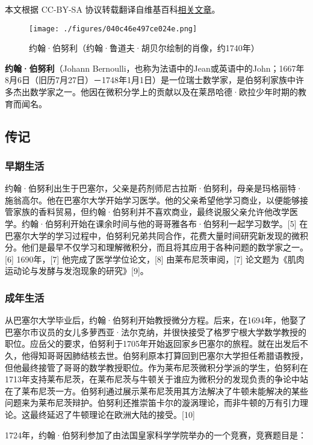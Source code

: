
本文根据 CC-BY-SA 协议转载翻译自维基百科\href{https://en.wikipedia.org/wiki/Johann_Bernoulli}{相关文章}。

\begin{figure}[ht]
\centering
\texttt{[image: ./figures/040c46e497ce024e.png]}
\caption{约翰·伯努利（约翰·鲁道夫·胡贝尔绘制的肖像，约1740年）} \label{fig_YHBNL_1}
\end{figure}
\textbf{约翰·伯努利}（Johann Bernoulli，也称为法语中的Jean或英语中的John；1667年8月6日（旧历7月27日）－1748年1月1日）是一位瑞士数学家，是伯努利家族中许多杰出数学家之一。他因在微积分学上的贡献以及在莱昂哈德·欧拉少年时期的教育而闻名。
\subsection{传记}  
\subsubsection{早期生活}  
约翰·伯努利出生于巴塞尔，父亲是药剂师尼古拉斯·伯努利，母亲是玛格丽特·施翁高尔。他在巴塞尔大学开始学习医学。他的父亲希望他学习商业，以便能够接管家族的香料贸易，但约翰·伯努利并不喜欢商业，最终说服父亲允许他改学医学。约翰·伯努利开始在课余时间与他的哥哥雅各布·伯努利一起学习数学。[5] 在巴塞尔大学的学习过程中，伯努利兄弟共同合作，花费大量时间研究新发现的微积分。他们是最早不仅学习和理解微积分，而且将其应用于各种问题的数学家之一。[6] 1690年，[7] 他完成了医学学位论文，[8] 由莱布尼茨审阅，[7] 论文题为《肌肉运动论与发酵与发泡现象的研究》[9]。
\subsubsection{成年生活} 
从巴塞尔大学毕业后，约翰·伯努利开始教授微分方程。后来，在1694年，他娶了巴塞尔市议员的女儿多萝西亚·法尔克纳，并很快接受了格罗宁根大学数学教授的职位。应岳父的要求，伯努利于1705年开始返回家乡巴塞尔的旅程。就在出发后不久，他得知哥哥因肺结核去世。伯努利原本打算回到巴塞尔大学担任希腊语教授，但他最终接管了哥哥的数学教授职位。作为莱布尼茨微积分学派的学生，伯努利在1713年支持莱布尼茨，在莱布尼茨与牛顿关于谁应为微积分的发现负责的争论中站在了莱布尼茨一方。伯努利通过展示莱布尼茨用其方法解决了牛顿未能解决的某些问题来为莱布尼茨辩护。伯努利还推崇笛卡尔的漩涡理论，而非牛顿的万有引力理论。这最终延迟了牛顿理论在欧洲大陆的接受。[10]

1724年，约翰·伯努利参加了由法国皇家科学学院举办的一个竞赛，竞赛题目是：

